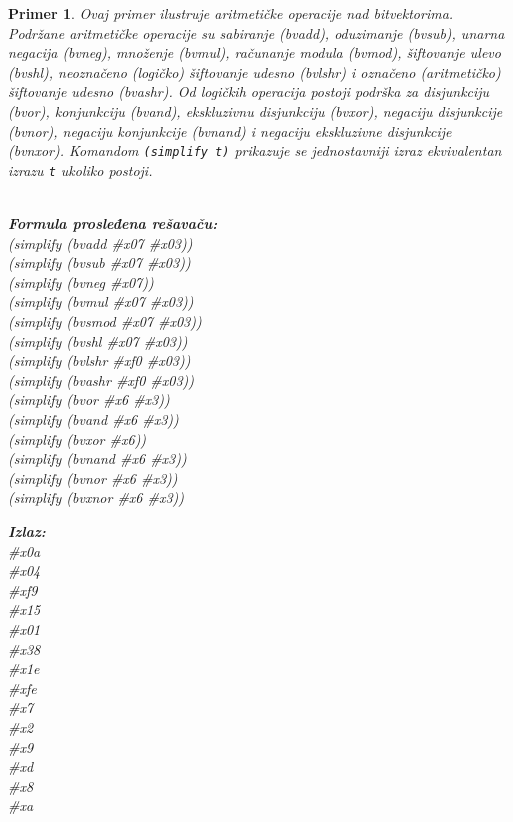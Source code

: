 \documentclass[12pt,oneside]{memoir}
\newtheorem{primer}{Primer}
\begin{document}
\begin{primer} Ovaj primer ilustruje aritmetičke operacije nad bitvektorima. Podržane aritmetičke operacije su sabiranje (bvadd), oduzimanje (bvsub), unarna negacija (bvneg), množenje (bvmul), računanje modula (bvmod), šiftovanje ulevo (bvshl), neoznačeno (logičko) šiftovanje udesno (bvlshr) i označeno (aritmetičko) šiftovanje udesno (bvashr). Od logičkih operacija postoji podrška za disjunkciju (bvor), konjunkciju (bvand), ekskluzivnu disjunkciju (bvxor), negaciju disjunkcije (bvnor), negaciju konjunkcije (bvnand) i negaciju ekskluzivne disjunkcije (bvnxor).
Komandom \texttt{(simplify t)} prikazuje se jednostavniji izraz ekvivalentan izrazu \texttt{t} ukoliko postoji.
\\\\
\begin{minipage}[b]{0.5\textwidth}
\textbf{Formula prosleđena rešavaču:}
\\(simplify (bvadd \#x07 \#x03)) 
\\(simplify (bvsub \#x07 \#x03)) 
\\(simplify (bvneg \#x07))       
\\(simplify (bvmul \#x07 \#x03)) 
\\(simplify (bvsmod \#x07 \#x03)) 
\\(simplify (bvshl \#x07 \#x03)) 
\\(simplify (bvlshr \#xf0 \#x03))  
\\(simplify (bvashr \#xf0 \#x03))  
\\(simplify (bvor \#x6 \#x3)) 
\\(simplify (bvand \#x6 \#x3))  
\\(simplify (bvxor \#x6)) 
\\(simplify (bvnand \#x6 \#x3)) 
\\(simplify (bvnor \#x6 \#x3)) 
\\(simplify (bvxnor \#x6 \#x3)) 
\end{minipage}
\hspace{2.5cm}
\begin{minipage}[b]{0.5\textwidth}
\textbf{Izlaz:}
\\\#x0a 
\\\#x04 
\\\#xf9 
\\\#x15 
\\\#x01 
\\\#x38 
\\\#x1e 
\\\#xfe
\\\#x7 
\\\#x2 
\\\#x9 
\\\#xd 
\\\#x8 
\\\#xa
\end{minipage}

\end{primer}
\end{document}
